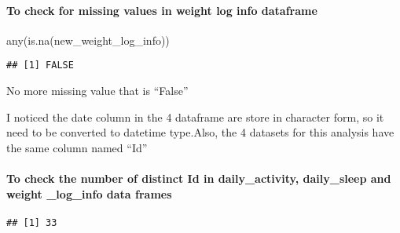 \documentclass[
]{article}
\newenvironment{Shaded}{\begin{snugshade}}{\end{snugshade}}
\newcommand{\FunctionTok}[1]{\textcolor[rgb]{0.00,0.00,0.00}{#1}}
\newcommand{\NormalTok}[1]{#1}
\newcommand{\SpecialCharTok}[1]{\textcolor[rgb]{0.00,0.00,0.00}{#1}}
\begin{document}
\hypertarget{to-check-for-missing-values-in-weight-log-info-dataframe}{%
\paragraph{To check for missing values in weight log info
dataframe}\label{to-check-for-missing-values-in-weight-log-info-dataframe}}

\begin{Shaded}
\begin{Highlighting}[]
\FunctionTok{any}\NormalTok{(}\FunctionTok{is.na}\NormalTok{(new\_weight\_log\_info)) }
\end{Highlighting}
\end{Shaded}

\begin{verbatim}
## [1] FALSE
\end{verbatim}

No more missing value that is ``False''

I noticed the date column in the 4 dataframe are store in character
form, so it need to be converted to datetime type.Also, the 4 datasets
for this analysis have the same column named ``Id''

\hypertarget{to-check-the-number-of-distinct-id-in-daily_activity-daily_sleep-and-weight-_log_info-data-frames}{%
\paragraph{To check the number of distinct Id in daily\_activity,
daily\_sleep and weight \_log\_info data
frames}\label{to-check-the-number-of-distinct-id-in-daily_activity-daily_sleep-and-weight-_log_info-data-frames}}

\begin{Shaded}
\end{Shaded}

\begin{verbatim}
## [1] 33
\end{verbatim}

\begin{Shaded}
\end{Shaded}
\end{document}
